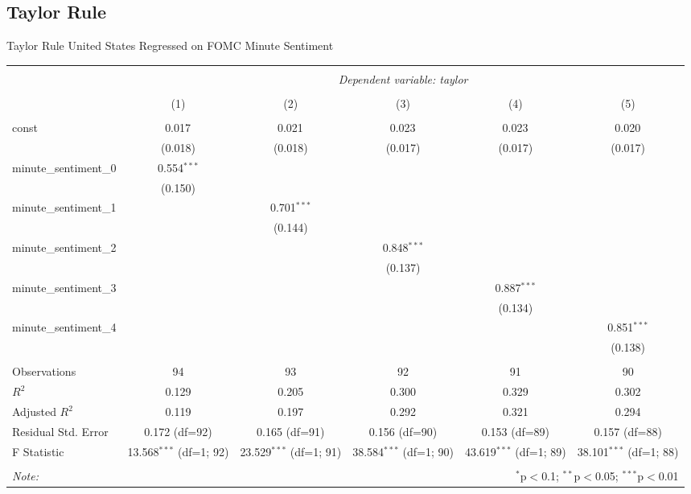 \documentclass[12pt, letterpaper]{article}
\begin{document}
\subsection{Taylor Rule}

Taylor Rule United States Regressed on FOMC Minute Sentiment

\begin{table}[H] 
\begin{adjustbox}{width=\textwidth}
\centering
\begin{tabular}{@{\extracolsep{5pt}}lccccc}
\\[-1.8ex]\hline
\hline \\[-1.8ex]
& \multicolumn{5}{c}{\textit{Dependent variable: taylor}} \\
\cline{2-6}
\\[-1.8ex] & (1) & (2) & (3) & (4) & (5) \\
\hline \\[-1.8ex]
const & 0.017$^{}$ & 0.021$^{}$ & 0.023$^{}$ & 0.023$^{}$ & 0.020$^{}$ \\
& (0.018) & (0.018) & (0.017) & (0.017) & (0.017) \\
minute\_sentiment\_0 & 0.554$^{***}$ & & & & \\
& (0.150) & & & & \\
minute\_sentiment\_1 & & 0.701$^{***}$ & & & \\
& & (0.144) & & & \\
minute\_sentiment\_2 & & & 0.848$^{***}$ & & \\
& & & (0.137) & & \\
minute\_sentiment\_3 & & & & 0.887$^{***}$ & \\
& & & & (0.134) & \\
minute\_sentiment\_4 & & & & & 0.851$^{***}$ \\
& & & & & (0.138) \\
\hline \\[-1.8ex]
Observations & 94 & 93 & 92 & 91 & 90 \\
$R^2$ & 0.129 & 0.205 & 0.300 & 0.329 & 0.302 \\
Adjusted $R^2$ & 0.119 & 0.197 & 0.292 & 0.321 & 0.294 \\
Residual Std. Error & 0.172 (df=92) & 0.165 (df=91) & 0.156 (df=90) & 0.153 (df=89) & 0.157 (df=88) \\
F Statistic & 13.568$^{***}$ (df=1; 92) & 23.529$^{***}$ (df=1; 91) & 38.584$^{***}$ (df=1; 90) & 43.619$^{***}$ (df=1; 89) & 38.101$^{***}$ (df=1; 88) \\
\hline
\hline \\[-1.8ex]
\textit{Note:} & \multicolumn{5}{r}{$^{*}$p$<$0.1; $^{**}$p$<$0.05; $^{***}$p$<$0.01} \\
\end{tabular}
\end{adjustbox}
\end{table}
\end{document}
